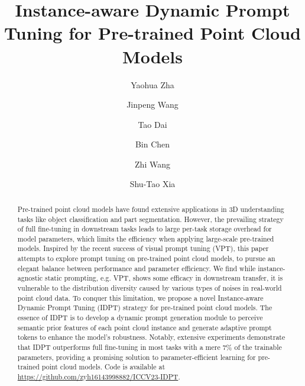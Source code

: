 \documentclass[10pt,twocolumn,letterpaper]{article}
\begin{document}
\title{Instance-aware Dynamic Prompt Tuning for Pre-trained Point Cloud Models}

\author[1 \thanks{These authors contributed equally to this work.}]{
    Yaohua Zha}
\author[1 ]{
    Jinpeng Wang}
\author[2 \thanks{Corresponding author.}]{
    Tao Dai}
\author[3]{
    Bin Chen}
\author[1]{
    Zhi Wang}
\author[1,4]{
    Shu-Tao Xia}

\maketitle
\ifcvffinal\thispagestyle{empty}\fi

\begin{abstract}
Pre-trained point cloud models have found extensive applications in 3D understanding tasks like object classification and part segmentation. 
However, the prevailing strategy of full fine-tuning in downstream tasks leads to large per-task storage overhead for model parameters, which limits the efficiency when applying large-scale pre-trained models. 
Inspired by the recent success of visual prompt tuning (VPT), this paper attempts to explore prompt tuning on pre-trained point cloud models, to pursue an elegant balance between performance and parameter efficiency. 
We find while instance-agnostic static prompting, e.g. VPT, shows some efficacy in downstream transfer, it is vulnerable to the distribution diversity caused by various types of noises in real-world point cloud data. 
To conquer this limitation, we propose a novel Instance-aware Dynamic Prompt Tuning (IDPT) strategy for pre-trained point cloud models. 
The essence of IDPT is to develop a dynamic prompt generation module to perceive semantic prior features of each point cloud instance and generate adaptive prompt tokens to enhance the model's robustness. 
Notably, extensive experiments demonstrate that IDPT outperforms full fine-tuning in most tasks with a mere 7\% of the trainable parameters, providing a promising solution to parameter-efficient learning for pre-trained point cloud models. 
Code is available at \url{https://github.com/zyh16143998882/ICCV23-IDPT}. 

\end{abstract}
\end{document}
